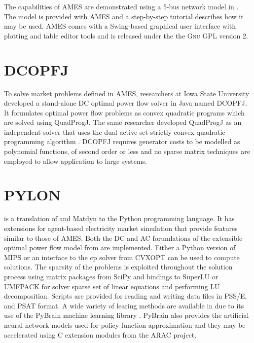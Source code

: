 The capabilities of AMES are demonstrated using a 5-bus network model in
.  The model is provided with AMES and a step-by-step
tutorial describes how it may be used.  AMES comes with a
Swing-based graphical user interface with plotting and table editor tools and
is released under the the \textsc{Gnu} GPL version 2.

\section{DCOPFJ}
\label{sec:dcopfj}
To solve market problems defined in AMES, researchers at Iowa State University
developed a stand-alone DC optimal power flow solver in Java named DCOPFJ.
It formulates optimal power flow problems as convex quadratic programs
which are solved using QuadProgJ.  The same researcher developed QuadProgJ as
an independent solver that uses the dual active set strictly convex quadratic
programming algorithm \cite{goldfarb:scqp}.  DCOPFJ requires
generator costs to be modelled as polynomial functions, of second order or
less and no sparse matrix techniques are employed to allow application to large
systems.

\section{PYLON}
\label{sec:pylon}

\pylon is a translation of \matpower and Matdyn to the Python programming
language.  It has extensions for agent-based electricity market simulation
that provide features similar to those of AMES.  Both the DC and AC
forumlations of the extensible optimal power flow model \cite{zimmerman:mp_pes}
from \matpower are implemented.  Either a Python version of MIPS or an
interface to the cp solver from CVXOPT can be used to compute solutions.  The
sparsity of the problems is exploited throughout the solution process using
matrix packages from SciPy and bindings to SuperLU or UMFPACK for solver sparse
set of linear equations and performing LU decomposition.  Scripts are provided
for reading and writing data files in PSS/E, \matpower and PSAT format. A wide
variety of learing methods are available in \pylon due to its use of the
PyBrain machine learning library \cite{schaul:2010}.  PyBrain also provides
the artificial neural network models used for policy function approximation
and they may be accelerated using C extension modules from the ARAC project.

